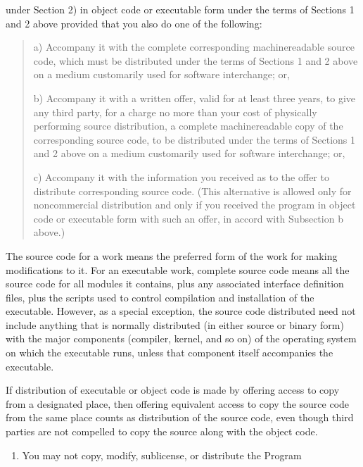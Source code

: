\documentclass[letterpaper,10pt,english]{sphinxmanual}
\begin{document}
under Section 2) in object code or executable form under the terms of
Sections 1 and 2 above provided that you also do one of the following:
\begin{quote}

a) Accompany it with the complete corresponding machine\sphinxhyphen{}readable
source code, which must be distributed under the terms of Sections
1 and 2 above on a medium customarily used for software interchange; or,

b) Accompany it with a written offer, valid for at least three
years, to give any third party, for a charge no more than your
cost of physically performing source distribution, a complete
machine\sphinxhyphen{}readable copy of the corresponding source code, to be
distributed under the terms of Sections 1 and 2 above on a medium
customarily used for software interchange; or,

c) Accompany it with the information you received as to the offer
to distribute corresponding source code.  (This alternative is
allowed only for noncommercial distribution and only if you
received the program in object code or executable form with such
an offer, in accord with Subsection b above.)
\end{quote}

The source code for a work means the preferred form of the work for
making modifications to it.  For an executable work, complete source
code means all the source code for all modules it contains, plus any
associated interface definition files, plus the scripts used to
control compilation and installation of the executable.  However, as a
special exception, the source code distributed need not include
anything that is normally distributed (in either source or binary
form) with the major components (compiler, kernel, and so on) of the
operating system on which the executable runs, unless that component
itself accompanies the executable.

If distribution of executable or object code is made by offering
access to copy from a designated place, then offering equivalent
access to copy the source code from the same place counts as
distribution of the source code, even though third parties are not
compelled to copy the source along with the object code.
\begin{enumerate}
%
\setcounter{enumi}{3}
\item {} 
You may not copy, modify, sublicense, or distribute the Program

\end{enumerate}
\end{document}
